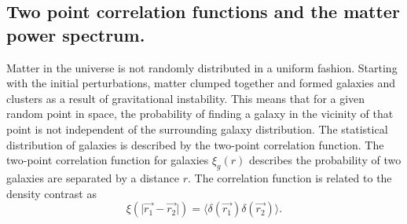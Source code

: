 \subsection{Two point correlation functions and the matter power spectrum.} \label{sec:corrtheory}
Matter in the universe is not randomly distributed in a uniform fashion. Starting with the initial perturbations, matter clumped together and formed galaxies and clusters as a result of gravitational instability. This means that for a given random point in space, the probability of finding
a galaxy in the vicinity of that point is not independent of the surrounding galaxy distribution. The statistical distribution
of galaxies is described by the two-point correlation function. The two-point correlation function for galaxies $\xi_{g}(r)$ describes the probability of two galaxies are separated by a distance $r$. The correlation function is related to the density contrast as
\begin{equation}
    \xi(\vert\vec{r_1}-\vec{r_2}\vert)=\langle\delta(\vec{r_1})\delta(\vec{r_2})\rangle.
\end{equation}

